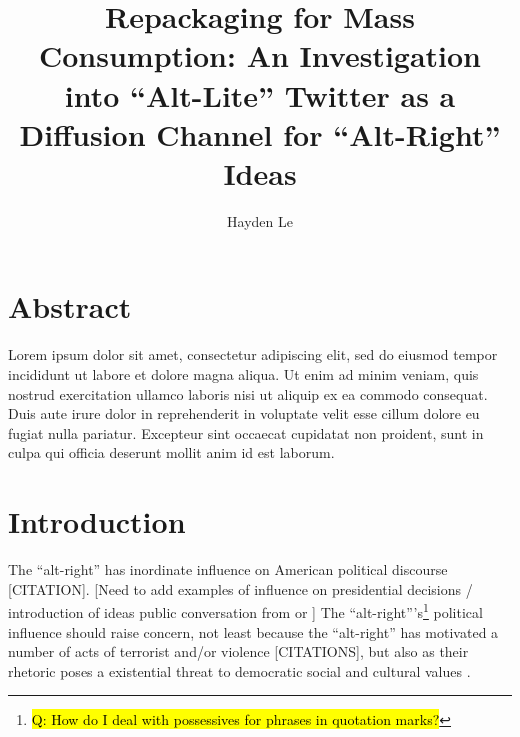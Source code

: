 \documentclass[acmlarge, screen, authorversion]{acmart}
\begin{document}
\title{Repackaging for Mass Consumption: An Investigation into ``Alt-Lite'' Twitter as a Diffusion Channel for ``Alt-Right'' Ideas}

\author{Hayden Le}

\maketitle

\section{Abstract}

Lorem ipsum dolor sit amet, consectetur adipiscing elit, sed do eiusmod tempor incididunt ut labore et dolore magna aliqua. Ut enim ad minim veniam, quis nostrud exercitation ullamco laboris nisi ut aliquip ex ea commodo consequat. Duis aute irure dolor in reprehenderit in voluptate velit esse cillum dolore eu fugiat nulla pariatur. Excepteur sint occaecat cupidatat non proident, sunt in culpa qui officia deserunt mollit anim id est laborum.

\section{Introduction}

The “alt-right” has inordinate influence on
American political discourse [CITATION]. [Need to add examples of influence on
presidential decisions / introduction of ideas public conversation from \citet{mainRiseAltRight2018} or \citet{sternProudBoysWhite2019}] The “alt-right”’s\footnote{\hl{Q: How do I deal with possessives for phrases in quotation marks?}} political influence should
raise concern, not least because the “alt-right” has motivated a number
of acts of terrorist and/or violence [CITATIONS], but also as their
rhetoric poses a existential threat to democratic social and cultural values \cite{danielsCyberRacismWhite2009}.
\end{document}
